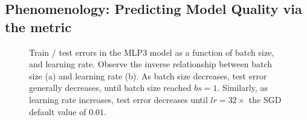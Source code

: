 
\subsection{\HTSR Phenomenology: Predicting Model Quality via the \ALPHA metric}
\label{sxn:empirical-test_acc}

\begin{figure}[t]
  \center
  \caption{Train / test errors in the MLP3 model as a function of batch size, and learning rate. Observe the inverse 
          relationship between batch size (a) and learning rate (b). As batch size decreases, test error generally 
          decreases, until batch size reached $bs=1$. Similarly, as learning rate increases, test error decreases until 
          $lr=32\times$ the SGD default value of $0.01$.
  }
  \label{fig:mlp3-accuracies}
\end{figure}

